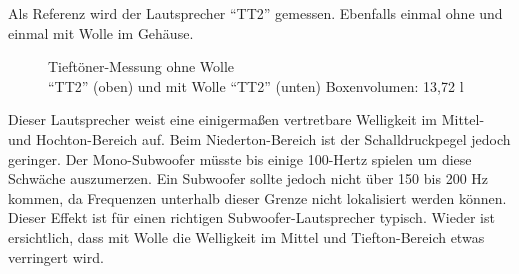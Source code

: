 \newpage
Als Referenz wird der Lautsprecher \enquote{TT2} gemessen. 
Ebenfalls einmal ohne und einmal mit Wolle im Gehäuse.
\begin{figure} [H]
	\centering
	\quad
	\caption{Tieftöner-Messung ohne Wolle\\ \enquote{TT2} (oben) und mit Wolle \enquote{TT2} (unten) Boxenvolumen: 13,72 l}
	\label{fig:4.2.4.2}
\end{figure}
Dieser Lautsprecher weist eine einigermaßen vertretbare Welligkeit im Mittel- und Hochton-Bereich auf.
Beim Niederton-Bereich ist der Schalldruckpegel jedoch geringer.
Der Mono-Subwoofer müsste bis einige 100-Hertz spielen um diese Schwäche auszumerzen.
Ein Subwoofer sollte jedoch nicht über 150 bis 200 Hz kommen, da Frequenzen unterhalb dieser Grenze nicht lokalisiert werden können.
Dieser Effekt ist für einen richtigen Subwoofer-Lautsprecher typisch.
Wieder ist ersichtlich, dass mit Wolle die Welligkeit im Mittel und Tiefton-Bereich etwas verringert wird.

